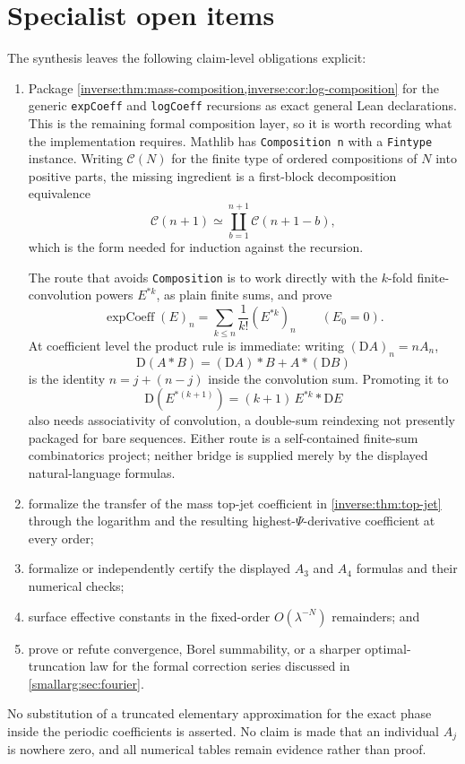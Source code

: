 \documentclass[11pt,oneside]{article}
\theoremstyle{definition}
\theoremstyle{remark}
\begin{document}
\section{Specialist open items}
\label{inverse:sec:specialist-open}
\label{smallarg:sec:open}
The synthesis leaves the following claim-level obligations explicit:
\begin{enumerate}
\item Package \cref{inverse:thm:mass-composition,inverse:cor:log-composition} for the generic
  \texttt{expCoeff} and \texttt{logCoeff} recursions as exact general Lean declarations.
  This is the remaining formal composition layer, so it is worth recording what the
  implementation requires.  Mathlib has \texttt{Composition n} with a \texttt{Fintype}
  instance.  Writing \(\mathcal C(N)\) for the finite type of ordered compositions of \(N\)
  into positive parts, the missing ingredient is a first-block decomposition equivalence
  \[
   \mathcal C(n+1)\simeq
   \coprod_{b=1}^{n+1}\mathcal C(n+1-b),
  \]
  which is the form needed for induction against the recursion.

  The route that avoids \texttt{Composition} is to work directly with the \(k\)-fold
  finite-convolution powers \(E^{*k}\), as plain finite sums, and prove
  \[
   \operatorname{expCoeff}(E)_n
   =\sum_{k\le n}\frac1{k!}(E^{*k})_n
   \qquad(E_0=0).
  \]
  At coefficient level the product rule is immediate: writing
  \((\mathrm DA)_n=nA_n\),
  \[
   \mathrm D(A*B)=(\mathrm DA)*B+A*(\mathrm DB)
  \]
  is the identity \(n=j+(n-j)\) inside the convolution sum.  Promoting it to
  \[
   \mathrm D(E^{*(k+1)})=(k+1)\,E^{*k}*\mathrm DE
  \]
  also needs associativity of convolution, a double-sum reindexing not presently packaged
  for bare sequences.  Either route is a self-contained finite-sum combinatorics project;
  neither bridge is supplied merely by the displayed natural-language formulas.
\item formalize the transfer of the mass top-jet coefficient in
  \cref{inverse:thm:top-jet} through the logarithm and the resulting
  highest-\(\Psi\)-derivative coefficient at every order;
\item formalize or independently certify the displayed \(A_3\) and \(A_4\) formulas and
  their numerical checks;
\item surface effective constants in the fixed-order \(O(\lambda^{-N})\) remainders; and
\item prove or refute convergence, Borel summability, or a sharper optimal-truncation law
  for the formal correction series discussed in \cref{smallarg:sec:fourier}.
\end{enumerate}
No substitution of a truncated elementary approximation for the exact phase inside the
periodic coefficients is asserted.  No claim is made that an individual \(A_j\) is nowhere
zero, and all numerical tables remain evidence rather than proof.
\end{document}
